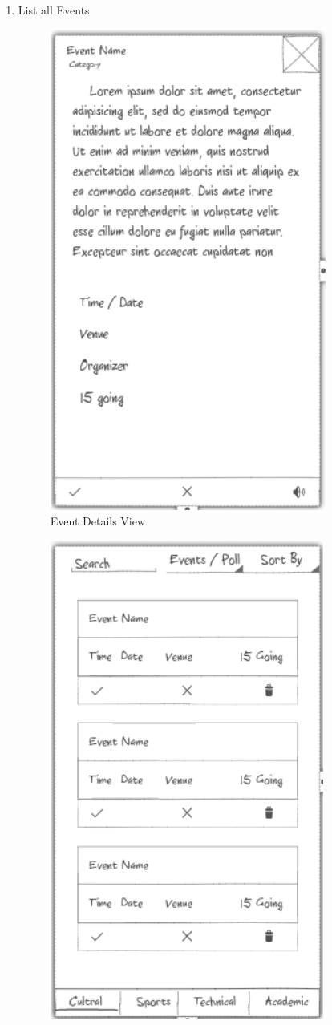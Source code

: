 \documentclass{article}
\begin{document}
\begin{enumerate}
\item {List all Events}
\begin{itemize}
\begin{figure}[h]
\centering
    \includegraphics[scale=0.3]{Event.png}
    \caption{Event Details View}
\end{figure}
\begin{figure}[h]
\centering
    \includegraphics[scale=0.3]{UM.png}

\end{figure}
\end{itemize}
\end{enumerate}
\end{document}
